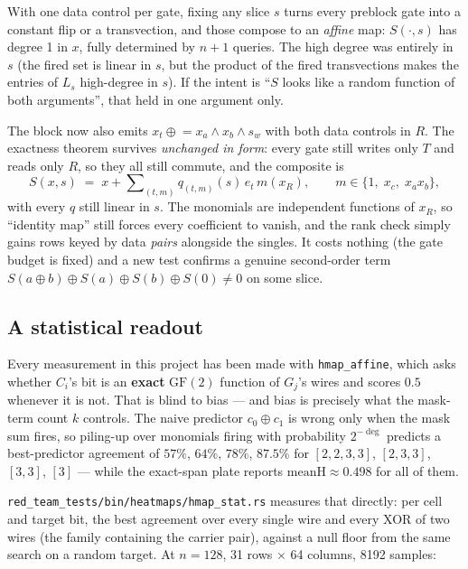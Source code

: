 \documentclass[11pt]{article}
\newcommand{\xor}{\oplus}
\begin{document}
With one data control per gate, fixing any slice $s$ turns every preblock gate
into a constant flip or a transvection, and those compose to an \emph{affine}
map: $S(\cdot,s)$ has degree 1 in $x$, fully determined by $n{+}1$ queries. The
high degree was entirely in $s$ (the fired set is linear in $s$, but the product
of the fired transvections makes the entries of $L_s$ high-degree in $s$). If
the intent is ``$S$ looks like a random function of both arguments'', that held
in one argument only.

The block now also emits $x_t \mathrel{\xor}= x_a \wedge x_b \wedge s_w$ with
both data controls in $R$. The exactness theorem survives \emph{unchanged in
form}: every gate still writes only $T$ and reads only $R$, so they all still
commute, and the composite is
\[
S(x,s) \;=\; x + \sum\nolimits_{(t,m)} q_{(t,m)}(s)\, e_t\, m(x_R),
\qquad m \in \{1,\; x_c,\; x_a x_b\},
\]
with every $q$ still linear in $s$. The monomials are independent functions of
$x_R$, so ``identity map'' still forces every coefficient to vanish, and the
rank check simply gains rows keyed by data \emph{pairs} alongside the singles.
It costs nothing (the gate budget is fixed) and a new test confirms a genuine
second-order term $S(a\xor b)\xor S(a)\xor S(b)\xor S(0)\neq 0$ on some slice.

\subsection{A statistical readout}

Every measurement in this project has been made with \texttt{hmap\_affine},
which asks whether $C_i$'s bit is an \textbf{exact} $\mathrm{GF}(2)$ function of
$G_j$'s wires and scores $0.5$ whenever it is not. That is blind to bias --- and
bias is precisely what the mask-term count $k$ controls. The naive predictor
$c_0 \xor c_1$ is wrong only when the mask sum fires, so piling-up over
monomials firing with probability $2^{-\deg}$ predicts a best-predictor
agreement of $57\%$, $64\%$, $78\%$, $87.5\%$ for
$[2,2,3,3]$, $[2,3,3]$, $[3,3]$, $[3]$ --- while the exact-span plate reports
$\mathrm{meanH}\approx 0.498$ for all of them.

\texttt{red\_team\_tests/bin/heatmaps/hmap\_stat.rs} measures that directly: per cell and target bit,
the best agreement over every single wire and every XOR of two wires (the family
containing the carrier pair), against a null floor from the same search on a
random target. At $n{=}128$, 31 rows $\times$ 64 columns, 8192 samples:
\end{document}
